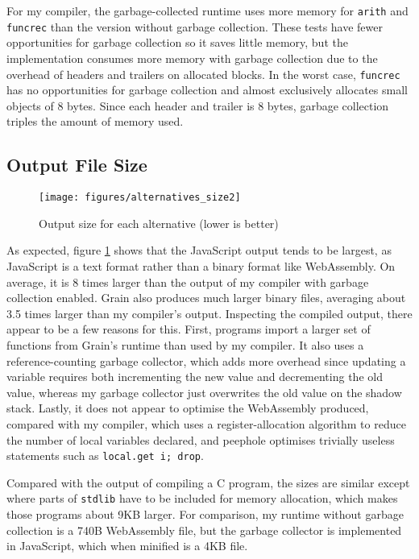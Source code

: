 For my compiler, the garbage-collected runtime uses more memory for \verb|arith| and \verb|funcrec| than the version without garbage collection.
These tests have fewer opportunities for garbage collection so it saves little memory, but the implementation consumes more memory with garbage collection due to the overhead of headers and trailers on allocated blocks. In the worst case, \verb|funcrec| has no opportunities for garbage collection and almost exclusively allocates small objects of 8 bytes. Since each header and trailer is 8 bytes, garbage collection triples the amount of memory used.



\subsection{Output File Size}

\begin{figure}[H]
\hspace{-1.2cm}
\texttt{[image: figures/alternatives\_size2]}
\vspace{-0.8cm}
\caption{Output size for each alternative (lower is better)}
 \label{fig:alt_size} 
\end{figure}

As expected, figure \ref{fig:alt_size} shows that the JavaScript output tends to be largest, as JavaScript is a text format rather than a binary format like WebAssembly. On average, it is 8 times larger than the output of my compiler with garbage collection enabled. Grain also produces much larger binary files, averaging about 3.5 times larger than my compiler's output. Inspecting the compiled output, there appear to be a few reasons for this. First, programs import a larger set of functions from Grain's runtime than used by my compiler. It also uses a reference-counting garbage collector, which adds more overhead since updating a variable requires both incrementing the new value and decrementing the old value, whereas my garbage collector just overwrites the old value on the shadow stack. Lastly, it does not appear to optimise the WebAssembly produced, compared with my compiler, which uses a register-allocation algorithm to reduce the number of local variables declared, and peephole optimises trivially useless statements such as \verb|local.get i; drop|.

Compared with the output of compiling a C program, the sizes are similar except where parts of \verb|stdlib| have to be included for memory allocation, which makes those programs about 9KB larger. For comparison, my runtime without garbage collection is a 740B WebAssembly file, but the garbage collector is implemented in JavaScript, which when minified is a 4KB file.


